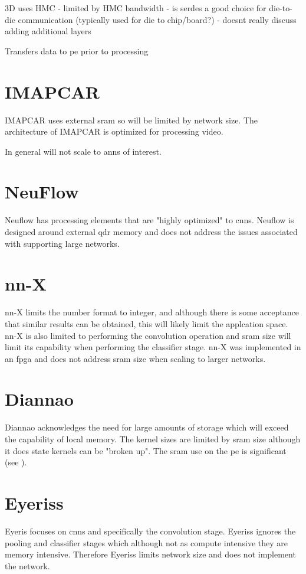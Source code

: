 {{{3D uses HMC
 - limited by HMC bandwidth
 - is serdes a good choice for die-to-die communication (typically used for die to chip/board?)
 - doesnt really discuss adding additional layers

Transfers data to \ac{pe} prior to processing


\section[IMAPCAR]{IMAPCAR \cite{kyo2011imapcar}}
IMAPCAR uses external \ac{sram} so will be limited by network size.
The architecture of IMAPCAR is optimized for processing video.

In general will not scale to \acp{ann} of interest.


\section{NeuFlow \cite{farabet2011neuflow}}
Neuflow\cite{farabet2011neuflow} has processing elements that are "highly optimized" to \acp{cnn}.
Neuflow is designed around external \ac{qdr} memory and does not address the issues associated with supporting large networks.


\section[nn-X]{nn-X \cite{gokhale2014240}}
nn-X\cite{gokhale2014240} limits the number format to integer, and although there is some acceptance that similar
results can be obtained, this will likely limit the applcation space. nn-X is also limited to performing the convolution operation
and \ac{sram} size will limit its capability when performing the classifier stage.
nn-X was implemented in an fpga and does not address \ac{sram} size when scaling to larger networks.


\section[Diannao]{Diannao \cite{chen2014diannao}}
Diannao\cite{chen2014diannao} acknowledges the need for large amounts of storage which will exceed the capability of local memory.
The kernel sizes are limited by \ac{sram} size although it does state kernels can be "broken up".
The \ac{sram} use on the \ac{pe} is significant (see ).


\section[Eyeriss]{Eyeriss \cite{chen201614}}
Eyeris\cite{chen201614} focuses on \acp{cnn} and specifically the convolution stage.
Eyeriss ignores the pooling and classifier stages which although not as compute intensive they are memory intensive.
Therefore Eyeriss limits network size and does not implement the network.

}}}
